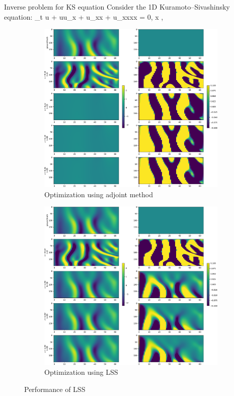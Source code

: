 \documentclass[NUS-Kajima workshop]{beamer}
\begin{document}
\begin{frame}{Inverse problem for KS equation}
	Consider the 1D Kuramoto–Sivashinsky equation:
	\bequ\label{KS}
		\p_t u + uu_x + u_{xx} + \nu u_{xxxx} = 0, \quad x \in [0, L],
	\eequ
	\begin{figure}[ht]
		\centering
		\begin{subfigure}{0.5\linewidth} %
			\centering
			\includegraphics[width=\linewidth]{fig/ks-adjoint-cloudmap2.pdf}
			\caption{Optimization using adjoint method}
		  \end{subfigure}%
		  \begin{subfigure}{0.5\linewidth} %
			\centering
			\includegraphics[width=\linewidth]{fig/ks-lss-cloudmap.pdf}
			\caption{Optimization using LSS}
		  \end{subfigure}
		  \caption{Performance of LSS}
	\end{figure}
\end{frame}
\end{document}
